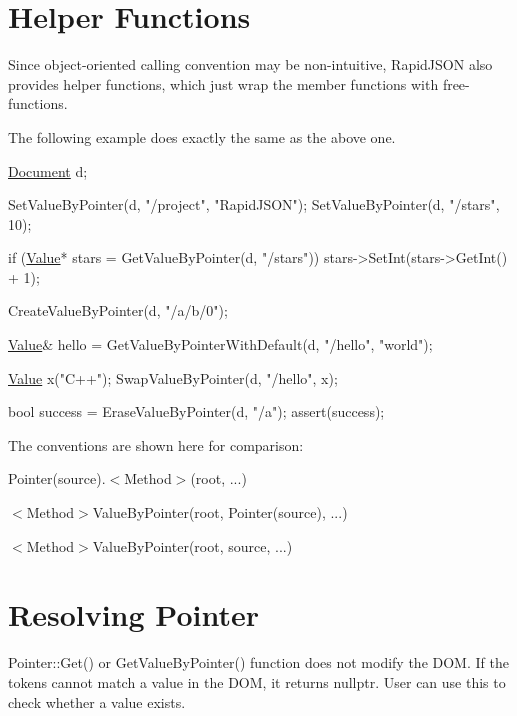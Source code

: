 \hypertarget{md_Commun_Externe_RapidJSON_doc_pointer_HelperFunctions}{}\section{Helper Functions}\label{md_Commun_Externe_RapidJSON_doc_pointer_HelperFunctions}
Since object-\/oriented calling convention may be non-\/intuitive, Rapid\+J\+S\+ON also provides helper functions, which just wrap the member functions with free-\/functions.

The following example does exactly the same as the above one.


\begin{DoxyCode}
\hyperlink{class_generic_document}{Document} d;

SetValueByPointer(d, \textcolor{stringliteral}{"/project"}, \textcolor{stringliteral}{"RapidJSON"});
SetValueByPointer(d, \textcolor{stringliteral}{"/stars"}, 10);

\textcolor{keywordflow}{if} (\hyperlink{class_generic_value}{Value}* stars = GetValueByPointer(d, \textcolor{stringliteral}{"/stars"}))
    stars->SetInt(stars->GetInt() + 1);

CreateValueByPointer(d, \textcolor{stringliteral}{"/a/b/0"});

\hyperlink{class_generic_value}{Value}& hello = GetValueByPointerWithDefault(d, \textcolor{stringliteral}{"/hello"}, \textcolor{stringliteral}{"world"});

\hyperlink{class_generic_value}{Value} x(\textcolor{stringliteral}{"C++"});
SwapValueByPointer(d, \textcolor{stringliteral}{"/hello"}, x);

\textcolor{keywordtype}{bool} success = EraseValueByPointer(d, \textcolor{stringliteral}{"/a"});
assert(success);
\end{DoxyCode}


The conventions are shown here for comparison\+:


\begin{DoxyEnumerate}
\item {\ttfamily Pointer(source).$<$Method$>$(root, ...)}
\item {\ttfamily $<$Method$>$Value\+By\+Pointer(root, Pointer(source), ...)}
\item {\ttfamily $<$Method$>$Value\+By\+Pointer(root, source, ...)}
\end{DoxyEnumerate}\hypertarget{md_Commun_Externe_RapidJSON_doc_pointer_ResolvingPointer}{}\section{Resolving Pointer}\label{md_Commun_Externe_RapidJSON_doc_pointer_ResolvingPointer}
{\ttfamily Pointer\+::\+Get()} or {\ttfamily Get\+Value\+By\+Pointer()} function does not modify the D\+OM. If the tokens cannot match a value in the D\+OM, it returns {\ttfamily nullptr}. User can use this to check whether a value exists.

